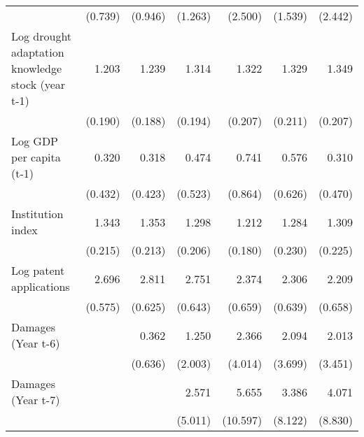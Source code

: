 \begin{table}[htbp]
\begin{tabular}{l*{6}{D{.}{.}{-1}}}
                    &     (0.739)         &     (0.946)         &     (1.263)         &     (2.500)         &     (1.539)         &     (2.442)         \\
\addlinespace
Log drought adaptation knowledge stock (year t-1)&       1.203         &       1.239         &       1.314\sym{*}  &       1.322\sym{*}  &       1.329\sym{*}  &       1.349\sym{*}  \\
                    &     (0.190)         &     (0.188)         &     (0.194)         &     (0.207)         &     (0.211)         &     (0.207)         \\
\addlinespace
Log GDP per capita (t-1)&       0.320         &       0.318         &       0.474         &       0.741         &       0.576         &       0.310         \\
                    &     (0.432)         &     (0.423)         &     (0.523)         &     (0.864)         &     (0.626)         &     (0.470)         \\
\addlinespace
Institution index   &       1.343\sym{*}  &       1.353\sym{*}  &       1.298\sym{*}  &       1.212         &       1.284         &       1.309\sym{\%}  \\
                    &     (0.215)         &     (0.213)         &     (0.206)         &     (0.180)         &     (0.230)         &     (0.225)         \\
\addlinespace
Log patent applications&       2.696\sym{***}&       2.811\sym{***}&       2.751\sym{***}&       2.374\sym{***}&       2.306\sym{***}&       2.209\sym{***}\\
                    &     (0.575)         &     (0.625)         &     (0.643)         &     (0.659)         &     (0.639)         &     (0.658)         \\
\addlinespace
Damages (Year t-6)  &                     &       0.362         &       1.250         &       2.366         &       2.094         &       2.013         \\
                    &                     &     (0.636)         &     (2.003)         &     (4.014)         &     (3.699)         &     (3.451)         \\
\addlinespace
Damages (Year t-7)  &                     &                     &       2.571         &       5.655         &       3.386         &       4.071         \\
                    &                     &                     &     (5.011)         &    (10.597)         &     (8.122)         &     (8.830)         \\

\end{tabular}
\end{table}
